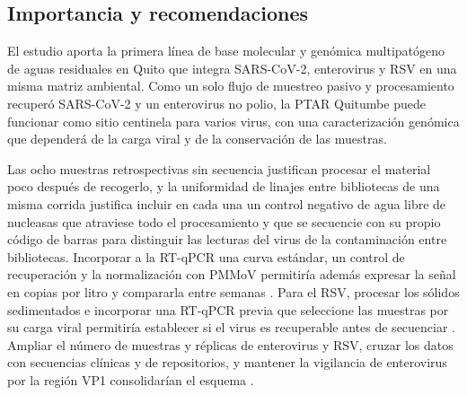 \subsection{Importancia y recomendaciones}

El estudio aporta la primera línea de base molecular y genómica multipatógeno de aguas residuales en Quito que integra SARS-CoV-2, enterovirus y RSV en una misma matriz ambiental. Como un solo flujo de muestreo pasivo y procesamiento recuperó SARS-CoV-2 y un enterovirus no polio, la PTAR Quitumbe puede funcionar como sitio centinela para varios virus, con una caracterización genómica que dependerá de la carga viral y de la conservación de las muestras.

Las ocho muestras retrospectivas sin secuencia justifican procesar el material poco después de recogerlo, y la uniformidad de linajes entre bibliotecas de una misma corrida justifica incluir en cada una un control negativo de agua libre de nucleasas que atraviese todo el procesamiento y que se secuencie con su propio código de barras para distinguir las lecturas del virus de la contaminación entre bibliotecas. Incorporar a la RT-qPCR una curva estándar, un control de recuperación y la normalización con PMMoV permitiría además expresar la señal en copias por litro y compararla entre semanas \cite{Ahmed_2020}. Para el RSV, procesar los sólidos sedimentados e incorporar una RT-qPCR previa que seleccione las muestras por su carga viral permitiría establecer si el virus es recuperable antes de secuenciar \cite{RoldanHernandez_2023,Le_2025}. Ampliar el número de muestras y réplicas de enterovirus y RSV, cruzar los datos con secuencias clínicas y de repositorios, y mantener la vigilancia de enterovirus por la región VP1 consolidarían el esquema \cite{Hughes_2022}.
